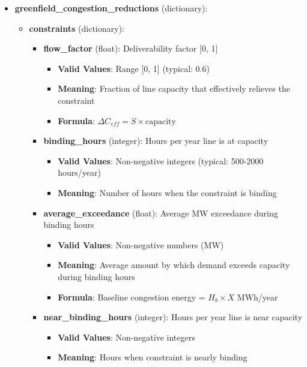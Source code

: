 \documentclass[ctcc_full_documentation.tex]{subfiles}
\begin{document}
\begin{itemize}
    \item \textbf{greenfield\_congestion\_reductions} (dictionary):
    \begin{itemize}
        \item \textbf{constraints} (dictionary):
        \begin{itemize}
            \item \textbf{flow\_factor} (float): Deliverability factor [0, 1]
            \begin{itemize}
                \item \textbf{Valid Values}: Range [0, 1] (typical: 0.6)
                \item \textbf{Meaning}: Fraction of line capacity that effectively relieves the constraint
                \item \textbf{Formula}: $\Delta C_{eff} = S \times \text{capacity}$
            \end{itemize}
            
            \item \textbf{binding\_hours} (integer): Hours per year line is at capacity
            \begin{itemize}
                \item \textbf{Valid Values}: Non-negative integers (typical: 500-2000 hours/year)
                \item \textbf{Meaning}: Number of hours when the constraint is binding
            \end{itemize}
            
            \item \textbf{average\_exceedance} (float): Average MW exceedance during binding hours
            \begin{itemize}
                \item \textbf{Valid Values}: Non-negative numbers (MW)
                \item \textbf{Meaning}: Average amount by which demand exceeds capacity during binding hours
                \item \textbf{Formula}: Baseline congestion energy = $H_b \times X$ MWh/year
            \end{itemize}
            
            \item \textbf{near\_binding\_hours} (integer): Hours per year line is near capacity
            \begin{itemize}
                \item \textbf{Valid Values}: Non-negative integers
                \item \textbf{Meaning}: Hours when constraint is nearly binding
            \end{itemize}
            

\end{itemize}
\end{itemize}
\end{itemize}
\end{document}

